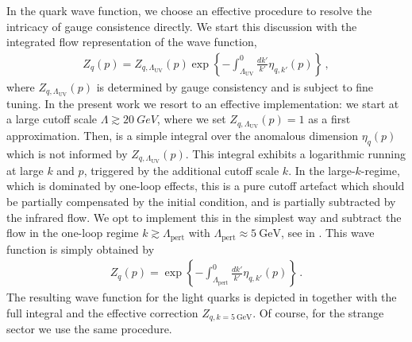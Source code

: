 \documentclass[aps,twocolumn,prd,superscriptaddress]{revtex4-2}
\begin{document}
In the quark wave function, we choose an effective procedure to resolve the intricacy of gauge consistence directly. We start this discussion with the integrated flow representation of the wave function, 
%
\begin{align}
	Z_q(p) = Z_{q,\Lambda_\textrm{UV}}(p) \exp\left\{- \int_{\Lambda_\textrm{UV}}^0 \frac{d k'}{k'} \eta_{q,k'}(p)\right\}\,,
	\label{eq:ZqpFull}
\end{align} 
%
where $Z_{q,\Lambda_\textrm{UV}}(p)$ is determined by gauge consistency and is subject to fine tuning. 
In the present work we resort to an effective implementation: we start at a large cutoff scale $\Lambda \gtrsim \qty{20}{GeV}$, where we set  $Z_{q,\Lambda_\textrm{UV}}(p)=1$ as a first approximation. 
Then,  is a simple integral over the anomalous dimension $\eta_q(p)$ which is not informed by $Z_{q,\Lambda_\textrm{UV}}(p)$. 
This integral exhibits a logarithmic running at large $k$ and $p$, triggered by the additional cutoff scale $k$. In the large-$k$-regime, which is dominated by one-loop effects, this is a pure cutoff artefact which should be partially compensated by the initial condition, and is partially subtracted by the infrared flow.
We opt to implement this in the simplest way and subtract the flow in the one-loop regime $k\gtrsim \Lambda_\textrm{pert}$ with $\Lambda_\textrm{pert} \approx \qty{5}{\GeV}$, see  in .
This wave function is simply obtained by 
%
\begin{align}
	Z_q(p) = \exp\left\{- \int_{\Lambda_\textrm{pert}}^0 \frac{d k'}{k'} \eta_{q,k'}(p)\right\}\,.
	\label{eq:Zqp}
\end{align} 
%
The resulting wave function  for the light quarks is depicted in  together with the full integral  and the effective correction $Z_{q,k=\qty{5}{\GeV}}$. Of course, for the strange sector we use the same procedure.
\end{document}

